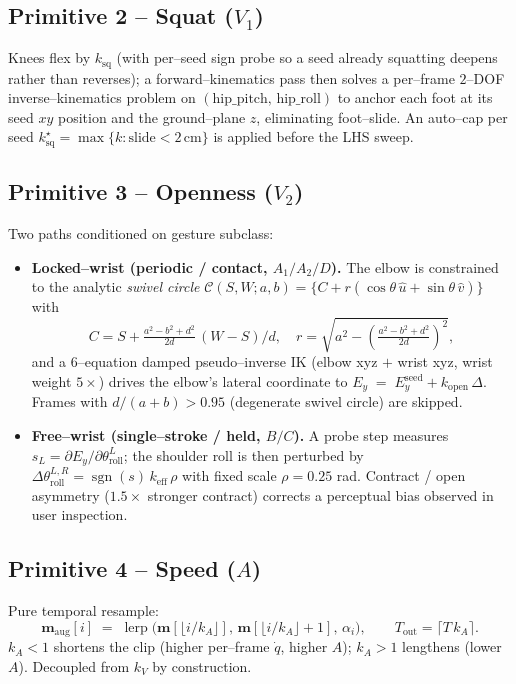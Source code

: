 \subsection{Primitive 2 -- Squat ($V_1$)}

Knees flex by $k_{\text{sq}}$ (with per--seed sign probe so a seed already
squatting deepens rather than reverses); a forward--kinematics pass then
solves a per--frame $2$--DOF inverse--kinematics problem on
$(\text{hip\_pitch},\,\text{hip\_roll})$ to anchor each foot at its seed
$xy$ position and the ground--plane $z$, eliminating foot--slide. An
auto--cap per seed
$k^{\star}_{\text{sq}}=\max\{k:\text{slide}<2\,\text{cm}\}$ is applied
before the LHS sweep.

\subsection{Primitive 3 -- Openness ($V_2$)}

Two paths conditioned on gesture subclass:
\begin{itemize}
  \item[\textbullet] \textbf{Locked--wrist (periodic / contact, $A_1/A_2/D$).}
    The elbow is constrained to the analytic
    \emph{swivel circle}
    $\mathcal{C}(S,W;a,b)=\{C+r(\cos\theta\,\hat{u}+\sin\theta\,\hat{v})\}$
    with
    \[
      C = S + \tfrac{a^2-b^2+d^2}{2d}\,(W-S)/d,\quad
      r = \sqrt{a^2 - \left(\tfrac{a^2-b^2+d^2}{2d}\right)^2},
    \]
    and a $6$--equation damped pseudo--inverse IK
    (elbow xyz $+$ wrist xyz, wrist weight $5\times$) drives the elbow's
    lateral coordinate to $E_y \;=\; E_y^{\text{seed}} + k_{\text{open}}\,\Delta$.
    Frames with $d/(a+b)>0.95$ (degenerate swivel circle) are skipped.
  \item[\textbullet] \textbf{Free--wrist (single--stroke / held, $B/C$).}
    A probe step measures
    $s_L\!=\!\partial E_y/\partial\theta_{\text{roll}}^{L}$;
    the shoulder roll is then perturbed by
    $\Delta\theta_{\text{roll}}^{L,R}=\operatorname{sgn}(s)\,k_{\text{eff}}\,\rho$
    with fixed scale $\rho=0.25$ rad. Contract / open asymmetry
    ($1.5\times$ stronger contract) corrects a perceptual bias observed
    in user inspection.
\end{itemize}

\subsection{Primitive 4 -- Speed ($A$)}

Pure temporal resample:
\begin{equation}
  \mathbf{m}_{\text{aug}}[i]
  \;=\; \operatorname{lerp}\!\bigl(\mathbf{m}[\lfloor i/k_A\rfloor],\,\mathbf{m}[\lfloor i/k_A\rfloor + 1],\,\alpha_i\bigr),
  \qquad T_{\text{out}}=\lceil T\,k_A\rceil.
  \label{eq:p4}
\end{equation}
$k_A<1$ shortens the clip (higher per--frame $\dot q$, higher $A$);
$k_A>1$ lengthens (lower $A$). Decoupled from $k_V$ by construction.

